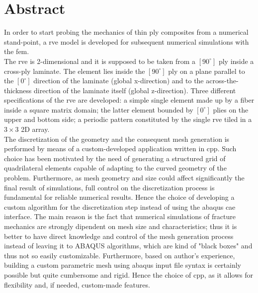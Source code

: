 \documentclass[a4paper, twoside,12pt, abstract]{scrartcl} %
\begin{document}

\clearscrheadings
\pagestyle{scrheadings}
\manualmark
\ofoot{\\ \pagemark} %
\ifoot{} %
\setheadtopline{2pt}
\setheadsepline{0.5pt}
\setfootsepline{0.5pt}

\section*{Abstract}
In order to start probing the mechanics of thin ply composites from a numerical stand-point, a \acrfull{rve} model is developed for subsequent numerical simulations with the \acrfull{fem}.\\
The \acrshort{rve} is 2-dimensional and it is supposed to be taken from a $\left[90^{\circ}\right]$ ply inside a cross-ply laminate. The element lies inside the $\left[90^{\circ}\right]$ ply on a plane parallel to the $\left[0^{\circ}\right]$ direction of the laminate (global x-direction) and to the across-the-thickness direction of the laminate itself (global z-direction). Three different specifications of the \acrshort{rve} are developed: a simple single element made up by a fiber inside a square matrix domain; the latter element bounded by $\left[0^{\circ}\right]$ plies on the upper and bottom side; a periodic pattern constituted by the single \acrshort{rve} tiled in a $3\times 3$ 2D array.\\
The discretization of the geometry and the consequent mesh generation is performed by means of a custom-developed application written in \gls{cpp}. Such choice has been motivated by the need of generating a structured grid of quadrilateral elements capable of adapting to the curved geometry of the problem. Furthermore, as mesh geometry and size could affect significantly the final result of simulations, full control on the discretization process is fundamental for reliable numerical results. Hence the choice of developing a custom algorithm for the discretization step instead of using the \gls{abaqus} \acrshort{cae} interface. The main reason is the fact that numerical simulations of fracture mechanics are strongly dipendent on mesh size and characteristics; thus it is better to have direct knowledge and control of the mesh generation process instead of leaving it to ABAQUS algorithms, which are kind of "black boxes" and thus not so easily customizable. Furthermore, based on author's experience, building a custom parametric mesh using \gls{abaqus} input file syntax is certainly possible but quite cumbersome and rigid. Hence the choice of \gls{cpp}, as it allows for flexibility and, if needed, custom-made features.\\
\end{document}
